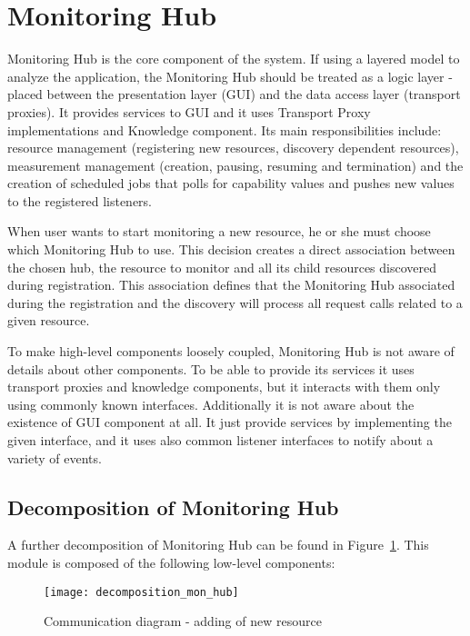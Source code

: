 %
\section{Monitoring Hub}
\label{sec:arch_monitoring_hub}

Monitoring Hub is the core component of the system. If using a layered model to analyze the application, the Monitoring Hub should be treated as a logic layer - placed between the presentation layer (GUI) and the data access layer (transport proxies). It provides services to GUI and it uses Transport Proxy implementations and Knowledge component. Its main responsibilities include: resource management (registering new resources, discovery dependent resources), measurement management (creation, pausing, resuming and termination) and the creation of scheduled jobs that polls for capability values and pushes new values to the registered listeners.

When user wants to start monitoring a new resource, he or she must choose which Monitoring Hub to use. This decision creates a direct association between the chosen hub, the resource to monitor and all its child resources discovered during registration. This association defines that the Monitoring Hub associated during the registration and the discovery will process all request calls related to a given resource.

To make high-level components loosely coupled, Monitoring Hub is not aware of details about other components. To be able to provide its services it uses transport proxies and knowledge components, but it interacts with them only using commonly known interfaces. Additionally it is not aware about the existence of GUI component at all. It just provide services by implementing the given interface, and it uses also common listener interfaces to notify about a variety of events.


\subsection{Decomposition of Monitoring Hub}

A further decomposition of Monitoring Hub can be found in Figure~\ref{fig:decomposition_mon_hub}. This module is composed of the following low-level components:

\begin{figure}[ht]
\centering
\texttt{[image: decomposition\_mon\_hub]}
\caption{Communication diagram - adding of new resource}
\label{fig:decomposition_mon_hub}
\end{figure}

